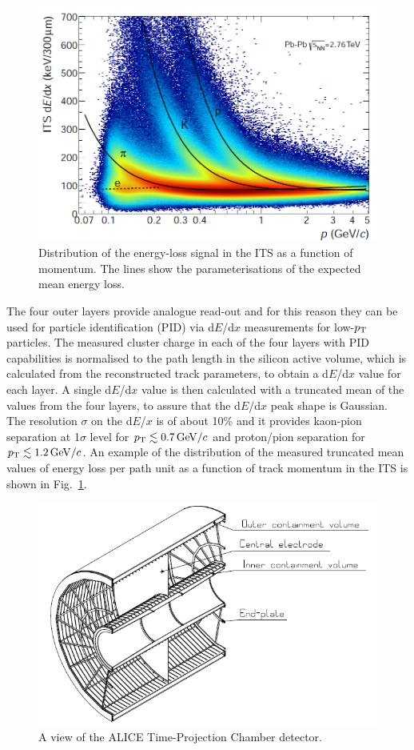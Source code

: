  \begin{figure}[!h]
\centering
\includegraphics[width=.65\textwidth]{FigCap3/ITSpid.png}
\caption{Distribution of the energy-loss signal in the ITS as a function of momentum. The lines show the parameterisations of the expected mean energy loss.}
\label{fig:imagePIDITS}
\end{figure}

 The four outer layers provide analogue read-out and for this reason they 
 can be used for particle identification (PID) via d$E$/d$x$ measurements for 
 low-$p_{\rm T}$ particles. The measured cluster charge in each of the four layers with PID capabilities is normalised to the path length
 in the silicon active volume, 
 which is calculated from the reconstructed track parameters, to obtain a d$E$/d$x$ 
 value for each layer. A single d$E$/d$x$ value is then calculated with a truncated mean of
 the values from the four layers, to assure that
 the d$E$/d$x$ peak shape is Gaussian. 
  The resolution $\sigma$ on the d$E$/$x$ is of about 10\% and it provides kaon-pion
 separation at 1$\sigma$ level for $p_{\rm T} \lesssim 0.7 \, \mathrm{GeV}/c$ and proton/pion separation 
 for $p_{\rm T} \lesssim 1.2 \, \mathrm{GeV}/c$.
 An example of the distribution of the measured truncated mean values of energy loss 
 per path unit as a function of track momentum in the ITS is shown 
 in Fig.~\ref{fig:imagePIDITS}. 
 \begin{figure}[!h]
\centering
\includegraphics[width=.6\textwidth]{FigCap3/TPC.png}
\caption{A view of the ALICE Time-Projection Chamber detector.}
\label{fig:imageTPC}
\end{figure}

